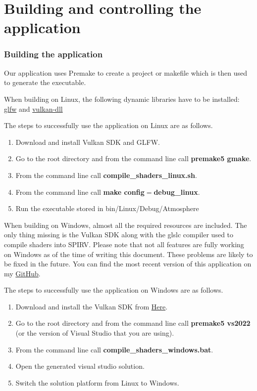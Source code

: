 \documentclass{ctuthesis}
\begin{document}



\appendix
\chapter{Building and controlling the application}
\subsection{Building the application}
Our application uses Premake to create a project or makefile which is then used to generate the executable.

When building on Linux, the following dynamic libraries have to be installed: \href{https://www.glfw.org}{glfw}
and \href{https://vulkan.lunarg.com/sdk/home#linux}{vulkan-dll} 

The steps to successfully use the application on Linux are as follows.

\begin{enumerate}
    \item Download and install Vulkan SDK and GLFW.
    \item Go to the root directory and from the command line call \textbf{premake5 gmake}.
    \item From the command line call \textbf{compile\_shaders\_linux.sh}.
    \item From the command line call \textbf{make config$=$debug\_linux}.
    \item Run the executable stored in bin/Linux/Debug/Atmosphere
\end{enumerate}

When building on Windows, almost all the required resources are included. The only thing missing is the 
Vulkan SDK along with the glslc compiler used to compile shaders into SPIRV. Please note that not all features are fully working
on Windows as of the time of writing this document. These problems are likely to be fixed in the future. You can find 
the most recent version of this application on my \href{https://github.com/MatejSakmary/RenderingAtmospheres}{GitHub}.

The steps to successfully use the application on Windows are as follows.

\begin{enumerate}
    \item Download and install the Vulkan SDK from \href{https://vulkan.lunarg.com/sdk/home#windows}{Here}.
    \item Go to the root directory and from the command line call \textbf{premake5 vs2022} (or the version of Visual Studio that you are using).
    \item From the command line call \textbf{compile\_shaders\_windows.bat}.
    \item Open the generated visual studio solution.
    \item Switch the solution platform from Linux to Windows.
\end{enumerate}
\end{document}

